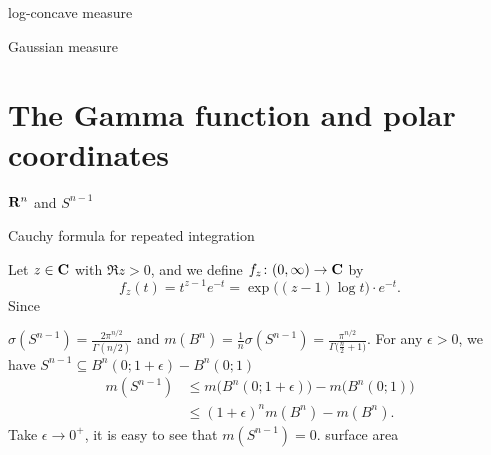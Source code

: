 \begin{namedthm}
    
\end{namedthm}

\begin{namedthm}
    
\end{namedthm}

log-concave measure

Gaussian measure

\section{The Gamma function and polar coordinates} 
$\mathbf{R}^n$ and $S^{n-1}$

Cauchy formula for repeated integration

\label{sec:polar}
Let $z \in \mathbf{C}$ with $\Re z > 0$, and we define $f_z\colon (0,\infty)\to \mathbf{C}$ by \[f_z(t) = t^{z-1} e^{-t} = \exp\bigl((z-1)\log t\bigr)\cdot e^{-t}.\] Since 

$\sigma(S^{n-1})=\frac{2\pi^{n/2}}{\Gamma(n/2)}$ and $m(B^{n})=\frac{1}{n}\sigma(S^{n-1})=\frac{\pi^{n/2}}{\Gamma\bigl(\frac{n}{2}+1\bigr)}$.
For any $\epsilon>0$, we have $S^{n-1}\subseteq B^{n}(0;1+\epsilon)-B^{n}(0;1)$
\begin{align*}
m(S^{n-1}) & \leq m\bigl(B^{n}(0;1+\epsilon)\bigr)-m\bigl(B^{n}(0;1)\bigr)\\
 & \leq(1+\epsilon)^{n}m(B^{n})-m(B^{n}).
\end{align*}
Take $\epsilon\to0^{+}$, it is easy to see that $m(S^{n-1})=0$.
surface area